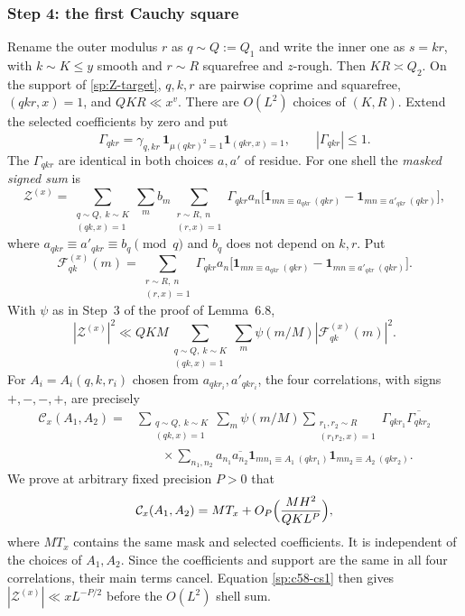 \subsubsection*{Step 4: the first Cauchy square}
Rename the outer modulus $r$ as $q\sim Q:=Q_1$ and write the inner one as
$s=kr$, with $k\sim K\le y$ smooth and $r\sim R$ squarefree and $z$-rough.
Then $KR\asymp Q_2$. On the support of \eqref{sp:Z-target}, $q,k,r$ are
pairwise coprime and squarefree, $(qkr,x)=1$, and $QKR\ll x^v$.
There are $O(L^2)$ choices of $(K,R)$. Extend the selected coefficients
by zero and put
\[
 \Gamma_{qkr}=\gamma_{q,kr}\,\mathbf1_{\mu(qkr)^2=1}
             \mathbf1_{(qkr,x)=1},\qquad |\Gamma_{qkr}|\le1.
\]
The $\Gamma_{qkr}$ are identical in both choices $a,a'$ of residue.
For one shell the \emph{masked signed sum} is
\[
 \mathcal Z^{(x)}=
 \sum_{\substack{q\sim Q,\ k\sim K\\(qk,x)=1}}\sum_m b_m
 \sum_{\substack{r\sim R,\ n\\(r,x)=1}}\Gamma_{qkr}a_n
 \bigl[\mathbf1_{mn\equiv a_{qkr}\ (qkr)}
       -\mathbf1_{mn\equiv a'_{qkr}\ (qkr)}\bigr],
\]
where $a_{qkr}\equiv a'_{qkr}\equiv b_q\pmod q$ and $b_q$ does not
depend on $k,r$. Put
\[
 \mathcal F^{(x)}_{qk}(m)=
 \sum_{\substack{r\sim R,\ n\\(r,x)=1}}\Gamma_{qkr}a_n
 \bigl[\mathbf1_{mn\equiv a_{qkr}\ (qkr)}
       -\mathbf1_{mn\equiv a'_{qkr}\ (qkr)}\bigr].
\]
With $\psi$ as in Step~3 of the proof of Lemma~6.8,
\begin{equation}\label{sp:c58-cs1}
 |\mathcal Z^{(x)}|^2\ll QKM
 \sum_{\substack{q\sim Q,\ k\sim K\\(qk,x)=1}}
 \sum_m\psi(m/M)|\mathcal F^{(x)}_{qk}(m)|^2.
\end{equation}
For $A_i=A_i(q,k,r_i)$ chosen from $a_{qkr_i},a'_{qkr_i}$, the four
correlations, with signs $+,-,-,+$, are precisely
\[
 \begin{aligned}
 \mathcal C_x(A_1,A_2)={}&
 \sum_{\substack{q\sim Q,\ k\sim K\\(qk,x)=1}}
 \sum_m\psi(m/M)
 \sum_{\substack{r_1,r_2\sim R\\(r_1r_2,x)=1}}
 \Gamma_{qkr_1}\overline{\Gamma_{qkr_2}}\\[-2pt]
 &\qquad\times\sum_{n_1,n_2}a_{n_1}\overline{a_{n_2}}
 \mathbf1_{mn_1\equiv A_1\ (qkr_1)}
 \mathbf1_{mn_2\equiv A_2\ (qkr_2)}.
 \end{aligned}
\]
We prove at arbitrary fixed precision $P>0$ that
\begin{equation}\label{sp:C}
 \mathcal C_x(A_1,A_2)=MT_x+
 O_P\Bigl(\frac{MH^2}{QKL^{P}}\Bigr),
\end{equation}
where $MT_x$ contains the same mask and selected coefficients. It is
independent of the choices of $A_1,A_2$. Since the coefficients and
support are the same in all four correlations, their main terms cancel.
Equation \eqref{sp:c58-cs1} then gives
$|\mathcal Z^{(x)}|\ll xL^{-P/2}$ before the $O(L^2)$ shell sum.

